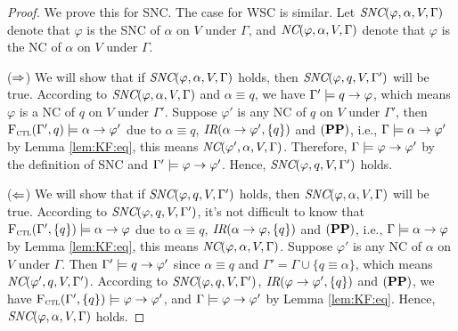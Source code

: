 \documentclass{article}
\begin{document}
 \begin{proof}
     We prove this for SNC. The case for WSC is similar.
     Let $\emph{SNC}(\varphi,\alpha,V,\Gamma)$ denote that $\varphi$ is the SNC of $\alpha$ on $V$ under $\Gamma$, and  $\emph{NC}(\varphi,\alpha,V,\Gamma)$ denote that $\varphi$ is the NC of $\alpha$ on $V$ under $\Gamma$.

     ($\Rightarrow$) We will show that if $\emph{SNC}(\varphi,\alpha,V,\Gamma)$ holds, then $\emph{SNC}(\varphi,q,V,\Gamma')$ will be true. According to $\emph{SNC}(\varphi,\alpha,V,\Gamma)$ and $\alpha\equiv q$, we have $\Gamma' \models q\rightarrow \varphi$, which means $\varphi$ is a NC of $q$ on $V$ under $\Gamma'$. Suppose $\varphi'$ is any NC of $q$ on $V$ under $\Gamma'$, then ${\textsc{F}_{\textsc{ctl}}}(\Gamma',q)\models \alpha \rightarrow \varphi'$ due to $\alpha\equiv q$, $\emph{IR}(\alpha \rightarrow \varphi', \{q\})$ and $(\textbf{PP})$, i.e., $\Gamma \models \alpha \rightarrow \varphi'$ by Lemma \ref{lem:KF:eq}, this means $\emph{NC}(\varphi',\alpha,V,\Gamma)$. Therefore, $\Gamma \models \varphi \rightarrow \varphi'$ by the definition of SNC and $\Gamma' \models \varphi \rightarrow \varphi'$. Hence, $\emph{SNC}(\varphi,q,V,\Gamma')$ holds.

     ($\Leftarrow$) We will show that if $\emph{SNC}(\varphi,q,V,\Gamma')$ holds, then $\emph{SNC}(\varphi,\alpha,V,\Gamma)$ will be true. According to $\emph{SNC}(\varphi,q,V,\Gamma')$, it's not difficult to know that ${\textsc{F}_{\textsc{ctl}}}(\Gamma', \{q\})\models \alpha \rightarrow \varphi$ due to $\alpha\equiv q$, $\emph{IR}(\alpha \rightarrow \varphi, \{q\})$ and $(\textbf{PP})$, i.e., $\Gamma \models \alpha \rightarrow \varphi$ by Lemma \ref{lem:KF:eq}, this means $\emph{NC}(\varphi,\alpha,V,\Gamma)$. Suppose $\varphi'$ is any NC of $\alpha$ on $V$ under $\Gamma$. Then $\Gamma' \models q \rightarrow \varphi'$ since $\alpha\equiv q$ and $\Gamma'=\Gamma \cup \{q\equiv \alpha\}$, which means $\emph{NC}(\varphi',q,V,\Gamma')$. According to $\emph{SNC}(\varphi,q,V,\Gamma')$, $\emph{IR}(\varphi \rightarrow \varphi', \{q\})$ and $(\textbf{PP})$, we have
     ${\textsc{F}_{\textsc{ctl}}}(\Gamma', \{q\})\models \varphi \rightarrow \varphi'$, and $\Gamma \models \varphi \rightarrow \varphi'$ by Lemma \ref{lem:KF:eq}. Hence, $\emph{SNC}(\varphi,\alpha,V, \Gamma)$ holds.
     \end{proof}
\end{document}
